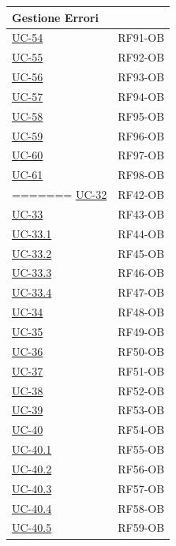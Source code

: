 ﻿\documentclass[a4paper,12pt]{article}
\begin{document}
\begin{description}[style=multiline, leftmargin=4cm, font=\bfseries]
\begin{enumerate}[leftmargin=*, nosep]
{\begin{longtable}{|p{4cm}|p{4cm}|}
    \multicolumn{2}{|l|}{\cellcolor{gray!12}\textbf{Gestione Errori}} \\
    \hline
    \hyperref[errore-uc-54]{UC-54} & RF91-OB \\
    \hline
    \hyperref[errore-uc-55]{UC-55} & RF92-OB \\
    \hline
    \hyperref[errore-uc-56]{UC-56} & RF93-OB \\
    \hline
    \hyperref[errore-uc-57]{UC-57} & RF94-OB \\
    \hline
    \hyperref[errore-uc-58]{UC-58} & RF95-OB \\
    \hline
    \hyperref[errore-uc-59]{UC-59} & RF96-OB \\
    \hline
    \hyperref[errore-uc-60]{UC-60} & RF97-OB \\
    \hline
    \hyperref[errore-uc-61]{UC-61} & RF98-OB \\
    \hline
=======
    \hyperref[fig:uc-32]{UC-32} & RF42-OB \\
    \hline
    \hyperref[fig:uc-33]{UC-33} & RF43-OB \\
    \hline
    \hyperref[fig:uc-33.1]{UC-33.1} & RF44-OB \\
    \hline
    \hyperref[fig:uc-33.2]{UC-33.2} & RF45-OB \\
    \hline
    \hyperref[fig:uc-33.3]{UC-33.3} & RF46-OB \\
    \hline
    \hyperref[fig:uc-33.4]{UC-33.4} & RF47-OB \\
    \hline
    \hyperref[fig:uc-34]{UC-34} & RF48-OB \\
    \hline
    \hyperref[fig:uc-35]{UC-35} & RF49-OB \\
    \hline
    \hyperref[fig:uc-36]{UC-36} & RF50-OB \\
    \hline
    \hyperref[fig:uc-37]{UC-37} & RF51-OB \\
    \hline
    \hyperref[fig:uc-38]{UC-38} & RF52-OB \\
    \hline
    \hyperref[fig:uc-39]{UC-39} & RF53-OB \\
    \hline
    \hyperref[fig:uc-40]{UC-40} & RF54-OB \\
    \hline
    \hyperref[fig:uc-40.1]{UC-40.1} & RF55-OB \\
    \hline
    \hyperref[fig:uc-40.2]{UC-40.2} & RF56-OB \\
    \hline
    \hyperref[fig:uc-40.3]{UC-40.3} & RF57-OB \\
    \hline
    \hyperref[fig:uc-40.4]{UC-40.4} & RF58-OB \\
    \hline
    \hyperref[fig:uc-40.5]{UC-40.5} & RF59-OB \\

\end{longtable}}
\end{enumerate}
\end{description}
\end{document}
